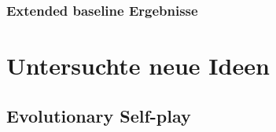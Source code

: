 \begin{frame}
 \frametitle{Extended baseline Ergebnisse}
  



  
\end{frame}

\section{Untersuchte neue Ideen}




\subsection{Evolutionary Self-play}



